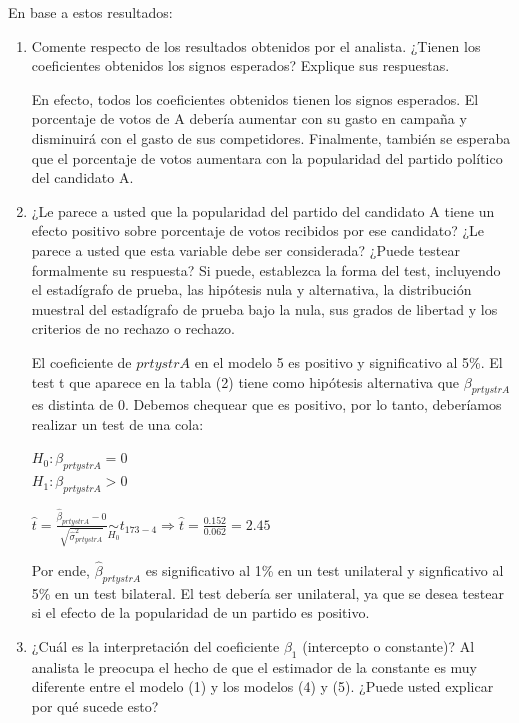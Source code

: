 \documentclass[10pt,a4paper]{article}
\begin{document}
En base a estos resultados:
\begin{enumerate}
\item Comente respecto de los resultados obtenidos por el analista. ¿Tienen
los coeficientes obtenidos los signos esperados?  Explique sus respuestas.

{\color{blue}En efecto, todos los coeficientes obtenidos tienen los signos esperados.
El porcentaje de votos de A debería aumentar con su gasto en campaña y disminuirá con el gasto de sus competidores. Finalmente, también se esperaba que el porcentaje de votos aumentara con la popularidad del partido político del candidato A.   }
\item  ¿Le
parece a usted que la popularidad del partido del candidato A tiene un efecto positivo
sobre porcentaje de votos recibidos por ese candidato?
¿Le parece a usted que esta variable debe ser considerada? ¿Puede
testear formalmente su respuesta? 
Si puede, establezca la forma del
test, incluyendo el estadígrafo de prueba, las hipótesis nula y alternativa,
la distribución muestral del estadígrafo de prueba bajo la nula, sus
grados de libertad y los criterios de no rechazo o rechazo. 

{\color{blue}El coeficiente de $prtystrA$ en el modelo 5 es positivo y significativo
al 5\%. El test t que aparece en la tabla (2) tiene como hipótesis alternativa que $\beta_{prtystrA}$ es distinta de 0. Debemos chequear que es positivo, por lo tanto, deberíamos realizar un test de una cola:  


$H_{0}:\beta_{prtystrA}=0$ \\ $H_{1}: \beta_{prtystrA}>0$

$\hat{t}=\frac{\hat{\beta}_{prtystrA}-0}{\sqrt{\hat{\sigma}_{prtystrA}^{2}}}\underset{H_{0}}{\sim}t_{173-4}\Rightarrow\hat{t}=\frac{0.152}{0.062}=2.45$ 


Por ende, $\hat{\beta}_{prtystrA}$ es significativo al 1\% en un
test unilateral y signficativo al 5\% en un test bilateral. El test debería ser unilateral, ya que se desea testear si el efecto de la popularidad de un partido es positivo. }


\item ¿Cuál es la interpretación del coeficiente $\beta_{1}$ (intercepto
o constante)? Al analista le preocupa el hecho de que el estimador
de la constante es muy diferente entre el modelo (1) y los modelos
(4) y (5). ¿Puede usted explicar por qué sucede esto?


\end{enumerate}
\end{document}
